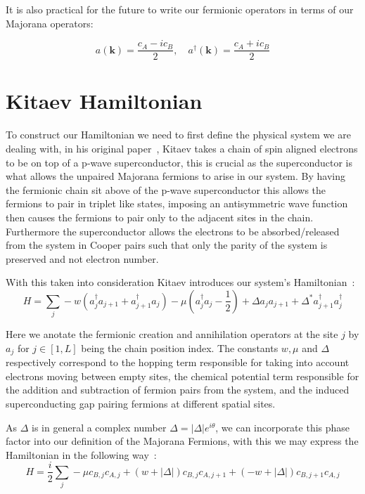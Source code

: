 \documentclass[11pt, a4paper]{article}
\numberwithin{equation}{section}
\begin{document}
It is also practical for the future to write our fermionic operators in terms of our Majorana operators:

\begin{equation}
    a(\mathbf{k}) = \frac{c_A - ic_B}{2}, \quad a^\dagger(\mathbf{k}) = \frac{c_A + ic_B}{2}
\end{equation}




\section{Kitaev Hamiltonian}\label{sec:Kitaev}
To construct our Hamiltonian we need to first define the physical system we are dealing with, in his original paper~\cite{Kitaev2000}, Kitaev takes
a chain of spin aligned electrons to be on top of a p-wave superconductor, this is crucial as the superconductor is what allows the unpaired Majorana fermions
to arise in our system. By having the fermionic chain sit above of the p-wave superconductor this allows the fermions to pair in triplet like states, 
imposing an antisymmetric wave function then causes the fermions to pair only to the adjacent sites in the chain. Furthermore the superconductor allows the 
electrons to be absorbed/released from the system in Cooper pairs such that only the parity of the system is preserved and not electron number.

With this taken into consideration Kitaev introduces our system's Hamiltonian~\cite{Kitaev2000}:
\begin{equation}
    H = \sum_j -w(a^\dagger_{j}a_{j+1} + a^\dagger_{j+1}a_j)-\mu(a^\dagger_j a_j - \frac{1}{2})+\Delta a_{j}a_{j+1} + \Delta^*a^\dagger_{j+1}a^\dagger_{j}
    \label{eq:kitaev_Hamiltonian_fermi}
\end{equation}


Here we anotate the fermionic creation and annihilation operators at the site $j$ by $a_j$ for $j \in [1,L]$ being the chain position index. The constants $w,\mu$ and $\Delta$ respectively correspond to the hopping term responsible for taking into account electrons moving between empty sites, the chemical potential
term responsible for the addition and subtraction of fermion pairs from the system, and the induced superconducting gap pairing fermions at different spatial sites.

As $\Delta$ is in general a complex number $\Delta = |\Delta|e^{i\theta}$, we can incorporate this phase factor into our definition of the Majorana Fermions, with this we may express the Hamiltonian in the following way~\cite{Kitaev2000}:
\begin{equation}
    H = \frac{i}{2}\sum_j  -\mu c_{B,j}c_{A,j} + (w + |\Delta|)c_{B,j}c_{A,j+1}+ (-w + |\Delta|)c_{B,j+1}c_{A,j}
    \label{eq:kitaev_Hamiltonian_Majorana}
\end{equation}
\end{document}
